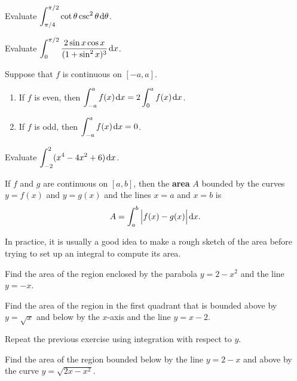\newpage

\begin{example}
Evaluate $\displaystyle\int_{\pi/4}^{\pi/2}\cot\theta\csc^2\theta\mkern 2mu \mathrm{d} \theta$.
\end{example}

\vfill

\begin{example}
Evaluate $\displaystyle\int_{0}^{\pi/2}\frac{2\sin x\cos x}{(1+\sin^2 x)^3}\mkern 2mu \mathrm{d} x$.
\end{example}

\vfill

\newpage

\begin{theorem}
Suppose that $f$ is continuous on $[-a, a]$.
\begin{enumerate}
\item If $f$ is even, then $\displaystyle\int_{-a}^a f(x)\mkern 2mu \mathrm{d} x = 2\int_0^af(x)\mkern 2mu \mathrm{d} x$.
\item If $f$ is odd, then $\displaystyle\int_{-a}^a f(x)\mkern 2mu \mathrm{d} x = 0$.
\end{enumerate}
\end{theorem}

\begin{example}
Evaluate $\displaystyle\int_{-2}^2(x^4-4x^2+6)\mkern 2mu \mathrm{d} x$.
\end{example}

\newpage

\begin{definition}
If $f$ and $g$ are continuous on $[a,b]$, then the \textbf{area} $A$ bounded by the curves $y=f(x)$ and $y=g(x)$  and the lines $x=a$ and $x=b$ is 
\begin{equation*}
A = \int_a^b\Big|f(x)-g(x)\Big|\mkern 2mu \mathrm{d} x.
\end{equation*}
\end{definition}
\begin{remark}
In practice, it is usually a good idea to make a rough sketch of the area before trying to set up an integral to compute its area.
\end{remark}

\begin{example}
Find the area of the region enclosed by the parabola $y=2-x^2$ and the line $y=-x$.
\end{example}

\newpage

\begin{example}
Find the area of the region in the first quadrant that is bounded above by $y=\sqrt x$ and below by the $x$-axis and the line $y=x-2$.
\end{example}

\newpage

\begin{example}
Repeat the previous exercise using integration with respect to $y$.
\end{example}

\newpage

\begin{example}
Find the area of the region bounded below by the line $y=2-x$ and above by the curve $y=\sqrt{2x-x^2}$.
\end{example}

